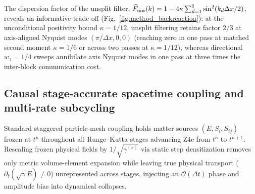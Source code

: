 \begin{enumerate}
\end{enumerate}
The dispersion factor of the unsplit filter, $\widehat{F}_{\rm uns}(k) = 1 - 4\kappa\sum_{d=1}^3 \sin^2(k_d\Delta x/2)$, reveals an informative trade-off (Fig.~\ref{fig:method_backreaction}): at the unconditional positivity bound $\kappa = 1/12$, unsplit filtering retains factor $2/3$ at axis-aligned Nyquist modes $(\pi/\Delta x, 0, 0)$ (reaching zero in one pass at matched second moment $\kappa = 1/6$ or across two passes at $\kappa = 1/12$), whereas directional $w_1 = 1/4$ sweeps annihilate axis Nyquist modes in one pass at three times the inter-block communication cost.

\subsection{Causal stage-accurate spacetime coupling and multi-rate subcycling}\label{sec:method_coupling}

Standard staggered particle-mesh coupling holds matter sources $(E, S_i, S_{ij})$ frozen at $t^n$ throughout all Runge--Kutta stages advancing Z4c from $t^n$ to $t^{n+1}$. Rescaling frozen physical fields by $1/\sqrt{\gamma^{(s)}}$ via static step densitization removes only metric volume-element expansion while leaving true physical transport ($\partial_t(\sqrt{\gamma}E) \ne 0$) unrepresented across stages, injecting an $\mathcal{O}(\Delta t)$ phase and amplitude bias into dynamical collapses.

